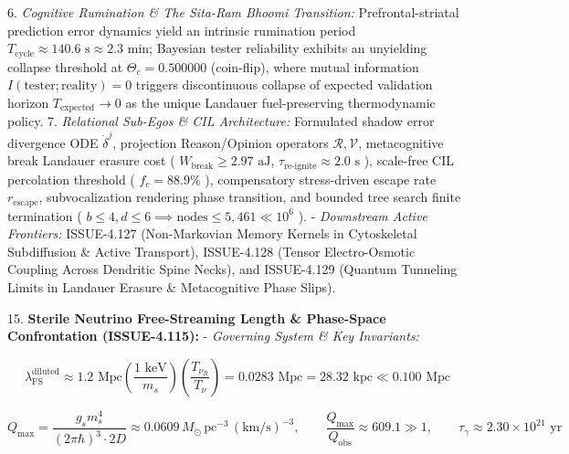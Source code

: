 \documentclass[11pt,a4paper]{article}
\theoremstyle{definition}
\theoremstyle{remark}
\begin{document}
6. \textit{Cognitive Rumination \& The Sita-Ram Bhoomi Transition:} Prefrontal-striatal prediction error dynamics yield an intrinsic rumination period $T_{\text{cycle}} \approx 140.6\text{ s} \approx 2.3\text{ min}$; Bayesian tester reliability exhibits an unyielding collapse threshold at $\Theta_c = 0.500000$ (coin-flip), where mutual information $I(\text{tester}; \text{reality}) = 0$ triggers discontinuous collapse of expected validation horizon $T_{\text{expected}} \to 0$ as the unique Landauer fuel-preserving thermodynamic policy.
7. \textit{Relational Sub-Egos \& CIL Architecture:} Formulated shadow error divergence ODE $\dot{\delta}^j$, projection Reason/Opinion operators $\mathcal{R}, \mathcal{V}$, metacognitive break Landauer erasure cost ( $W_{\text{break}} \ge 2.97\text{ aJ}$, $\tau_{\text{re-ignite}} \approx 2.0\text{ s}$ ), scale-free CIL percolation threshold ( $f_c = 88.9\%$ ), compensatory stress-driven escape rate $r_{\text{escape}}$, subvocalization rendering phase transition, and bounded tree search finite termination ( $b \le 4, d \le 6 \implies \text{nodes} \le 5{,}461 \ll 10^6$ ).
- \textit{Downstream Active Frontiers:} ISSUE-4.127 (Non-Markovian Memory Kernels in Cytoskeletal Subdiffusion \& Active Transport), ISSUE-4.128 (Tensor Electro-Osmotic Coupling Across Dendritic Spine Necks), and ISSUE-4.129 (Quantum Tunneling Limits in Landauer Erasure \& Metacognitive Phase Slips).

15. \textbf{Sterile Neutrino Free-Streaming Length \& Phase-Space Confrontation (ISSUE-4.115):}
- \textit{Governing System \& Key Invariants:}


\begin{equation}
\lambda_{\text{FS}}^{\text{diluted}} \approx 1.2\text{ Mpc} \left(\frac{1\text{ keV}}{m_s}\right) \left(\frac{T_{\nu_R}}{T_\nu}\right) = 0.0283\text{ Mpc} = 28.32\text{ kpc} \ll 0.100\text{ Mpc}
\end{equation}



\begin{equation}
Q_{\text{max}} = \frac{g_s m_s^4}{(2\pi\hbar)^3 \cdot 2D} \approx 0.0609 \, M_\odot \, \text{pc}^{-3} \, (\text{km/s})^{-3}, \qquad \frac{Q_{\text{max}}}{Q_{\text{obs}}} \approx 609.1 \gg 1, \qquad \tau_\gamma \approx 2.30 \times 10^{21}\text{ yr}
\end{equation}
\end{document}
